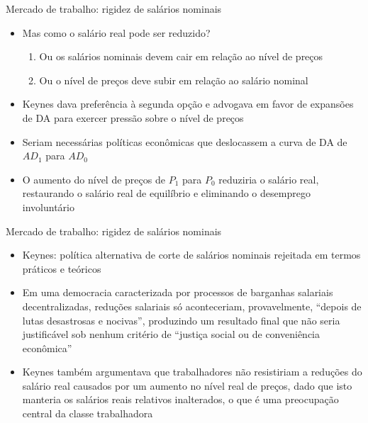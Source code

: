 \documentclass[10pt]{beamer}
\begin{document}
\begin{frame}{Mercado de trabalho: rigidez de salários nominais}
    \begin{itemize}
        \item Mas como o salário real pode ser reduzido?
        \bigskip
        \begin{enumerate}
            \item Ou os salários nominais devem cair em relação ao nível de preços
            \bigskip
            \item Ou o nível de preços deve subir em relação ao salário nominal
        \end{enumerate}
        \bigskip
        \item Keynes dava preferência à segunda opção e advogava em favor de expansões de DA para exercer pressão sobre o nível de preços
        \bigskip
        \item Seriam necessárias políticas econômicas que deslocassem a curva de DA de $AD_1$ para $AD_0$
        \bigskip
        \item O aumento do nível de preços de $P_1$ para $P_0$ reduziria o salário real, restaurando o salário real de equilíbrio e eliminando o desemprego involuntário
    \end{itemize}
\end{frame}

\begin{frame}{Mercado de trabalho: rigidez de salários nominais}
    \begin{itemize}
        \item Keynes: política alternativa de corte de salários nominais rejeitada em termos práticos e teóricos
        \bigskip
        \item Em uma democracia caracterizada por processos de barganhas salariais decentralizadas, reduções salariais só aconteceriam, provavelmente, ``depois de lutas desastrosas e nocivas'', produzindo um resultado final que não seria justificável sob nenhum critério de ``justiça social ou de conveniência econômica''
        \bigskip
        \item Keynes também argumentava que trabalhadores não resistiriam a reduções do salário real causados por um aumento no nível real de preços, dado que isto manteria os salários reais relativos inalterados, o que é uma preocupação central da classe trabalhadora
    \end{itemize}
\end{frame}
\end{document}
